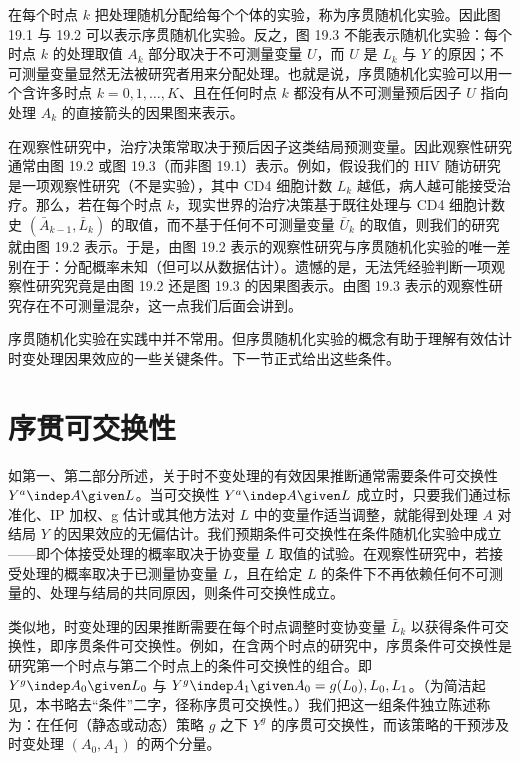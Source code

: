 在每个时点 $k$ 把处理随机分配给每个个体的实验，称为序贯随机化实验。因此图 19.1 与 19.2 可以表示序贯随机化实验。反之，图 19.3 不能表示随机化实验：每个时点 $k$ 的处理取值 $A_k$ 部分取决于不可测量变量 $U$，而 $U$ 是 $L_k$ 与 $Y$ 的原因；不可测量变量显然无法被研究者用来分配处理。也就是说，序贯随机化实验可以用一个含许多时点 $k=0,1,\ldots,K$、且在任何时点 $k$ 都没有从不可测量预后因子 $U$ 指向处理 $A_k$ 的直接箭头的因果图来表示。

在观察性研究中，治疗决策常取决于预后因子这类结局预测变量。因此观察性研究通常由图 19.2 或图 19.3（而非图 19.1）表示。例如，假设我们的 HIV 随访研究是一项观察性研究（不是实验），其中 CD4 细胞计数 $L_k$ 越低，病人越可能接受治疗。那么，若在每个时点 $k$，现实世界的治疗决策基于既往处理与 CD4 细胞计数史 $(\bar{A}_{k-1},\bar{L}_k)$ 的取值，而不基于任何不可测量变量 $\bar{U}_k$ 的取值，则我们的研究就由图 19.2 表示。于是，由图 19.2 表示的观察性研究与序贯随机化实验的唯一差别在于：分配概率未知（但可以从数据估计）。遗憾的是，无法凭经验判断一项观察性研究究竟是由图 19.2 还是图 19.3 的因果图表示。由图 19.3 表示的观察性研究存在不可测量混杂，这一点我们后面会讲到。

序贯随机化实验在实践中并不常用。但序贯随机化实验的概念有助于理解有效估计时变处理因果效应的一些关键条件。下一节正式给出这些条件。

\section{序贯可交换性}

如第一、第二部分所述，关于时不变处理的有效因果推断通常需要条件可交换性 $Y^a\indep A\given L$。当可交换性 $Y^a\indep A\given L$ 成立时，只要我们通过标准化、IP 加权、g 估计或其他方法对 $L$ 中的变量作适当调整，就能得到处理 $A$ 对结局 $Y$ 的因果效应的无偏估计。我们预期条件可交换性在条件随机化实验中成立——即个体接受处理的概率取决于协变量 $L$ 取值的试验。在观察性研究中，若接受处理的概率取决于已测量协变量 $L$，且在给定 $L$ 的条件下不再依赖任何不可测量的、处理与结局的共同原因，则条件可交换性成立。

类似地，时变处理的因果推断需要在每个时点调整时变协变量 $\bar{L}_k$ 以获得条件可交换性，即序贯条件可交换性。例如，在含两个时点的研究中，序贯条件可交换性是研究第一个时点与第二个时点上的条件可交换性的组合。即 $Y^g\indep A_0\given L_0$ 与 $Y^g\indep A_1\given A_0=g(L_0),L_0,L_1$。（为简洁起见，本书略去“条件”二字，径称序贯可交换性。）我们把这一组条件独立陈述称为：在任何（静态或动态）策略 $g$ 之下 $Y^g$ 的序贯可交换性，而该策略的干预涉及时变处理 $(A_0,A_1)$ 的两个分量。

